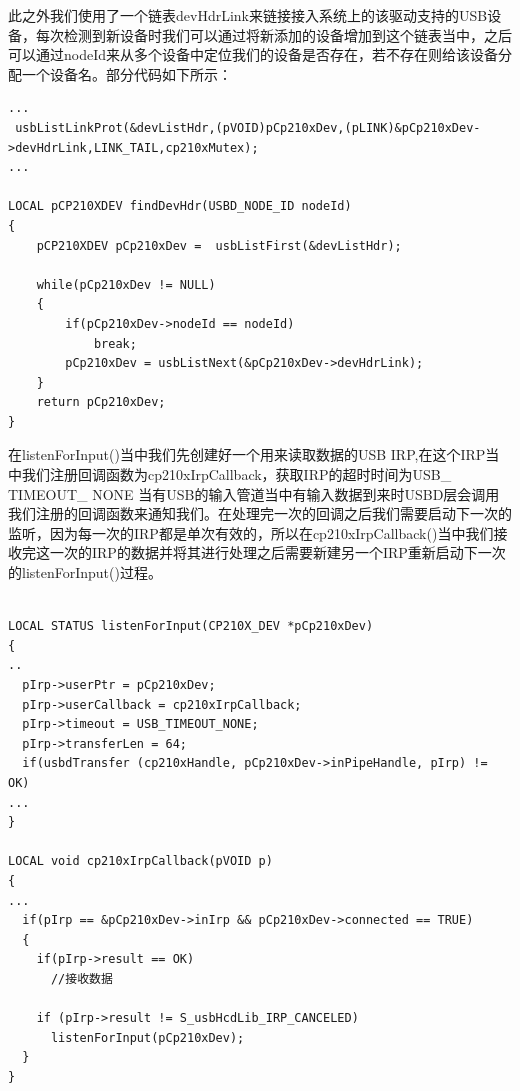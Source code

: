 此之外我们使用了一个链表devHdrLink来链接接入系统上的该驱动支持的USB设备，每次检测到新设备时我们可以通过将新添加的设备增加到这个链表当中，之后可以通过nodeId来从多个设备中定位我们的设备是否存在，若不存在则给该设备分配一个设备名。部分代码如下所示：
\lstset{language=C}
\begin{lstlisting}
...
 usbListLinkProt(&devListHdr,(pVOID)pCp210xDev,(pLINK)&pCp210xDev->devHdrLink,LINK_TAIL,cp210xMutex);
...

LOCAL pCP210XDEV findDevHdr(USBD_NODE_ID nodeId)
{
	pCP210XDEV pCp210xDev =  usbListFirst(&devListHdr);

	while(pCp210xDev != NULL)
	{
		if(pCp210xDev->nodeId == nodeId)
			break;
		pCp210xDev = usbListNext(&pCp210xDev->devHdrLink);
	}
	return pCp210xDev;
}
\end{lstlisting}















	在listenForInput()当中我们先创建好一个用来读取数据的USB IRP,在这个IRP当中我们注册回调函数为cp210xIrpCallback，获取IRP的超时时间为USB\_ TIMEOUT\_ NONE
	当有USB的输入管道当中有输入数据到来时USBD层会调用我们注册的回调函数来通知我们。在处理完一次的回调之后我们需要启动下一次的监听，因为每一次的IRP都是单次有效的，所以在cp210xIrpCallback()当中我们接收完这一次的IRP的数据并将其进行处理之后需要新建另一个IRP重新启动下一次的listenForInput()过程。
\lstset{language=C}
\begin{lstlisting}

LOCAL STATUS listenForInput(CP210X_DEV *pCp210xDev)
{
..
  pIrp->userPtr = pCp210xDev;
  pIrp->userCallback = cp210xIrpCallback;
  pIrp->timeout = USB_TIMEOUT_NONE;
  pIrp->transferLen = 64;
  if(usbdTransfer (cp210xHandle, pCp210xDev->inPipeHandle, pIrp) != OK)
...
}

LOCAL void cp210xIrpCallback(pVOID p)
{
...
  if(pIrp == &pCp210xDev->inIrp && pCp210xDev->connected == TRUE)
  {
	if(pIrp->result == OK)
	  //接收数据
			
	if (pIrp->result != S_usbHcdLib_IRP_CANCELED)
	  listenForInput(pCp210xDev);
  }
}

\end{lstlisting}






	
	
